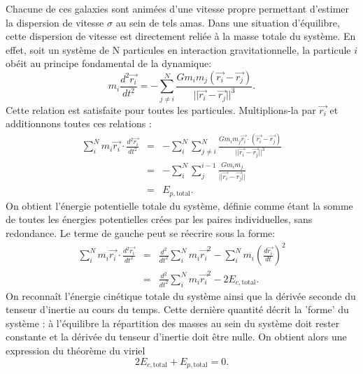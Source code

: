 Chacune de ces galaxies sont animées d'une vitesse propre permettant d'estimer la dispersion de vitesse $\sigma$ au sein de tels amas. Dans une situation d'équilibre, cette dispersion de vitesse est directement reliée à la masse totale du système. En effet, soit un système de N particules en interaction gravitationnelle, la particule $i$ obéit au principe fondamental de la dynamique:
\begin{equation}
m_i\frac{d^2 \vec{r_i}}{dt^2}=-\sum_{j\neq i}^N \frac{Gm_i m_j (\vec{r_i}-\vec{r_j})}{||\vec{r_i}-\vec{r_j}||^3}.
\end{equation}
Cette relation est satisfaite pour toutes les particules. Multiplions-la par $\vec{r_i}$ et additionnons toutes ces relations :
\begin{eqnarray}
\sum_i^N m_i\vec{r_i}\cdot\frac{d^2 \vec{r_i}}{dt^2}&=&-\sum_i^N \sum_{j\neq i}^N \frac{Gm_i m_j \vec{r_i}\cdot (\vec{r_i}-\vec{r_j})}{||\vec{r_i}-\vec{r_j}||^3}\\
&=& -\sum_i^N \sum_j^{i-1}\frac{Gm_i m_j}{||\vec{r_i}-\vec{r_j}||}\\
&=&E_{p,\mathrm{total}}.
\end{eqnarray}
On obtient l'énergie potentielle totale du système, définie comme étant la somme de toutes les énergies potentielles crées par les paires individuelles, sans redondance. Le terme de gauche peut se réecrire sous la forme:
\begin{eqnarray}
\sum_i^N m_i\vec{r_i}\cdot\frac{d^2 \vec{r_i}}{dt^2}&=&\frac{d^2}{dt^2}\sum_i^N m_i \vec{r_i}^2 - \sum_i^N m_i \left(\frac{d \vec{r_i}}{dt}\right)^2\\
&=&\frac{d^2}{dt^2}\sum_i^N m_i \vec{r_i}^2 - 2E_{c,\mathrm{total}}.
\end{eqnarray}
On reconnaît l'énergie cinétique totale du système ainsi que la dérivée seconde du tenseur d'inertie au cours du temps. Cette dernière quantité décrit la 'forme' du système : à l'équilibre la répartition des masses au sein du système doit rester constante et la dérivée du tenseur d'inertie doit être nulle. On obtient alors une expression du théorème du viriel
\begin{equation}
2E_{c,\mathrm{total}} + E_{p,\mathrm{total}} =0.
\end{equation}
